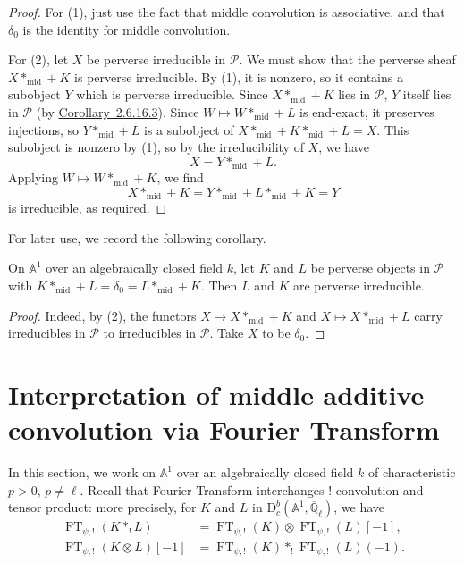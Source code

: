 \begin{proof}
For (1), just use the fact that middle convolution is associative, and that
\(\delta_0\) is the identity for middle convolution.

For (2), let \(X\) be perverse irreducible in \(\mathcal{P}\). We must show
that the perverse sheaf \(X*_{\mathrm{mid}}+K\) is perverse irreducible. By
(1), it is nonzero, so it contains a subobject \(Y\) which is perverse
irreducible. Since \(X*_{\mathrm{mid}}+K\) lies in \(\mathcal{P}\), \(Y\)
itself lies in \(\mathcal{P}\) (by \hyperref[cor:2.6.16.3]{Corollary~2.6.16.3}). Since
\(W\mapsto W*_{\mathrm{mid}}+L\) is end-exact, it preserves injections, so
\(Y*_{\mathrm{mid}}+L\) is a subobject of
\(X*_{\mathrm{mid}}+K*_{\mathrm{mid}}+L=X\). This subobject is nonzero by
(1), so by the irreducibility of \(X\), we have
\[
  X=Y*_{\mathrm{mid}}+L.
\]
Applying \(W\mapsto W*_{\mathrm{mid}}+K\), we find
\[
  X*_{\mathrm{mid}}+K
  =
  Y*_{\mathrm{mid}}+L*_{\mathrm{mid}}+K
  =
  Y
\]
is irreducible, as required.
\end{proof}

\noindent
For later use, we record the following corollary.

On \(\mathbb{A}^1\) over an algebraically closed field \(k\), let \(K\) and
\(L\) be perverse objects in \(\mathcal{P}\) with
\(K*_{\mathrm{mid}}+L=\delta_0=L*_{\mathrm{mid}}+K\). Then \(L\) and \(K\)
are perverse irreducible.

\begin{proof}
Indeed, by (2), the functors \(X\mapsto X*_{\mathrm{mid}}+K\) and
\(X\mapsto X*_{\mathrm{mid}}+L\) carry irreducibles in \(\mathcal{P}\) to
irreducibles in \(\mathcal{P}\). Take \(X\) to be \(\delta_0\).
\end{proof}

\section[Middle additive convolution via Fourier transform]{Interpretation of middle additive convolution via Fourier Transform}
\label{sec:2.10}

In this section, we work on \(\mathbb{A}^1\) over an algebraically closed field
\(k\) of characteristic \(p>0\), \(p\neq\ell\). Recall \cite[Cor.~9.6]{Br}
that Fourier Transform interchanges \(!\) convolution and tensor product:
more precisely, for \(K\) and \(L\) in
\(\mathrm{D}^b_c(\mathbb{A}^1,\overline{\mathbb{Q}}_\ell)\), we have
\[
  \begin{aligned}
    \operatorname{FT}_{\psi,!}(K*_!L)
      &=\operatorname{FT}_{\psi,!}(K)\otimes
        \operatorname{FT}_{\psi,!}(L)[-1],\\
    \operatorname{FT}_{\psi,!}(K\otimes L)[-1]
      &=\operatorname{FT}_{\psi,!}(K)*_!
        \operatorname{FT}_{\psi,!}(L)(-1).
  \end{aligned}
\]

